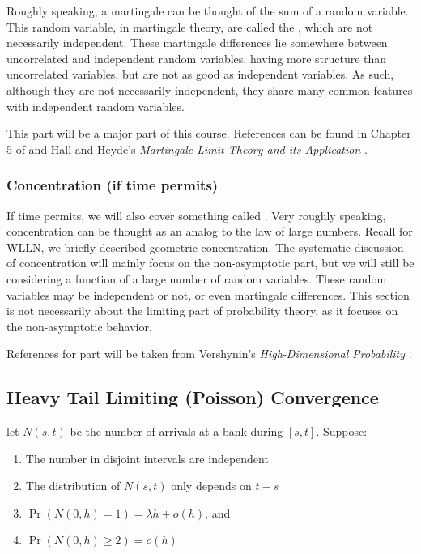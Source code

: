 \documentclass[../main/main.tex]{subfiles}
\begin{document}
Roughly speaking, a martingale can be thought of the sum of a random variable. This random variable, in martingale theory, are called the , which are not necessarily independent. These martingale differences lie somewhere between uncorrelated and independent random variables, having more structure than uncorrelated variables, but are not as good as independent variables. As such, although they are not necessarily independent, they share many common features with independent random variables.\\

\begin{remark}
	This part will be a major part of this course. References can be found in Chapter 5 of \cite{Durrett19} and Hall and Heyde's \textit{Martingale Limit Theory and its Application} \cite{Hall80}.
\end{remark}


\subsubsection{Concentration (if time permits)}

If time permits, we will also cover something called . Very roughly speaking, concentration can be thought as an analog to the law of large numbers. Recall for WLLN, we briefly described geometric concentration. The systematic discussion of concentration will mainly focus on the non-asymptotic part, but we will still be considering a function of a large number of random variables. These random variables may be independent or not, or even martingale differences. This section is not necessarily about the limiting part of probability theory, as it focuses on the non-asymptotic behavior.

\begin{remark}
	References for part will be taken from Vershynin's \textit{High-Dimensional Probability} \cite{Ver19}.
\end{remark}


\subsection{Heavy Tail Limiting (Poisson) Convergence}

let $N(s,t)$ be the number of arrivals at a bank during $[s,t]$. Suppose:

\begin{enumerate}[label=(\roman*)]
	\item  The number in disjoint intervals are independent
	\item The distribution of $N(s,t)$ only depends on $t-s$
	\item $\Pr(N(0,h)=1) = \lambda h + o(h)$, and
	\item $\Pr(N(0,h)\geq 2) = o(h)$
\end{enumerate}
\end{document}
